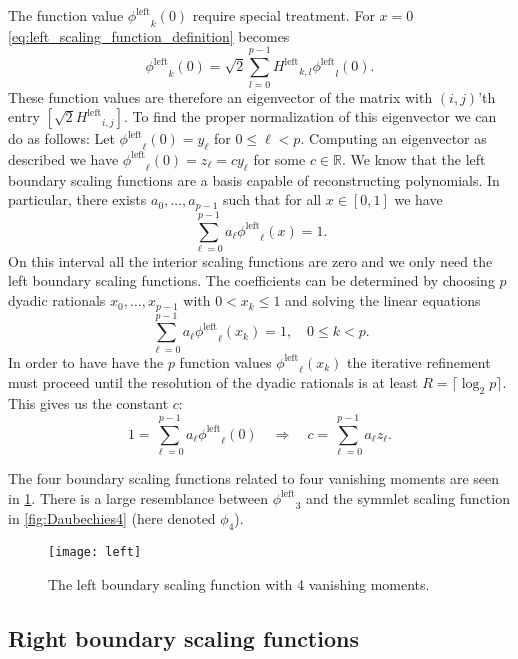\documentclass[a4paper]{scrartcl}
\newcommand\lphi{\ensuremath{\phi^{\text{left}}}}
\newcommand\lH{\ensuremath{H^{\text{left}}}}
\newcommand\R{\ensuremath{\mathbb{R}}}
\begin{document}
The function value $\lphi_k(0)$ require special treatment.
For $x = 0$ \eqref{eq:left_scaling_function_definition} becomes
\begin{equation*}
	\lphi_k(0)
    = \sqrt2 \sum_{l=0}^{p-1} \lH_{k,l} \lphi_l(0).
\end{equation*}
These function values are therefore an eigenvector of the matrix with $(i,j)$'th entry $[\sqrt2 \lH_{i,j}]$.
To find the proper normalization of this eigenvector we can do as follows:
Let $\lphi_\ell(0) = y_\ell$ for $0\leq \ell < p$.
Computing an eigenvector as described we have $\lphi_\ell(0) = z_\ell = c y_\ell$ for some $c \in \R$.
We know that the left boundary scaling functions are a basis capable of reconstructing polynomials.
In particular, there exists $a_0, \ldots, a_{p-1}$ such that for all $x \in [0, 1]$ we have
\begin{equation*}
    \sum_{\ell=0}^{p-1} a_\ell \lphi_\ell(x) = 1.
\end{equation*}
On this interval all the interior scaling functions are zero and we only need the left boundary scaling functions.
The coefficients can be determined by choosing $p$ dyadic rationals $x_0, \ldots, x_{p-1}$ with $0 < x_k \leq 1$ and solving the linear equations
\begin{equation*}
    \sum_{\ell=0}^{p-1} a_\ell \lphi_\ell(x_k) = 1, \quad 0\leq k< p.
\end{equation*}
In order to have have the $p$ function values $\lphi_\ell(x_k)$ the iterative refinement must proceed until the resolution of the dyadic rationals is at least $R = \lceil \log_2 p \rceil$.
This gives us the constant $c$:
\begin{equation*}
    1 = \sum_{\ell=0}^{p-1} a_\ell \lphi_\ell(0) 
    \quad\Rightarrow\quad
    c = \sum_{\ell=0}^{p-1} a_\ell z_\ell. 
\end{equation*}


The four boundary scaling functions related to four vanishing moments are seen in \cref{fig:left_Daubechies4}.
There is a large resemblance between $\lphi_3$ and the symmlet scaling function in \cref{fig:Daubechies4} (here denoted $\phi_4$).

\begin{figure}
	\centering
	\texttt{[image: left]}
	\caption{The left boundary scaling function with 4 vanishing moments.}
	\label{fig:left_Daubechies4}
\end{figure}


\subsection{Right boundary scaling functions}
\end{document}
